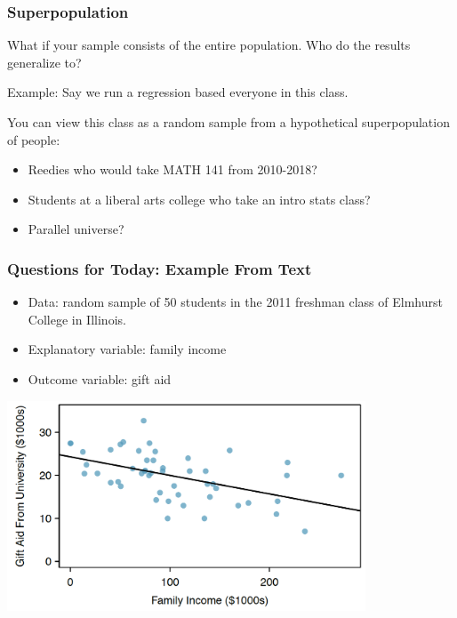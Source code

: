 \documentclass[handout]{beamer}
\newcommand{\blue}[1]{\textcolor{blue2}{#1}}
\begin{document}
\begin{frame}[fragile]
\frametitle{Superpopulation}

What if your sample consists of the \blue{entire} population.  Who do the results generalize to?

\vspace{0.25cm}

\pause Example:  Say we run a regression based everyone in this class.

\vspace{0.25cm}

\pause You can view this class as a random sample from a hypothetical \blue{superpopulation} of people:
\begin{itemize}
\pause\item Reedies who would take MATH 141 from 2010-2018?
\pause\item Students at a liberal arts college who take an intro stats class?
\pause\item Parallel universe?
\end{itemize}



\end{frame}



\begin{frame}[fragile]
\frametitle{Questions for Today: Example From Text}
\begin{itemize}
\item Data: random sample of 50 students in the 2011 freshman class of Elmhurst College in Illinois.
\pause\item Explanatory variable: family income
\pause\item Outcome variable: gift aid
\end{itemize}

\begin{center}
\includegraphics[width=0.8\textwidth]{figure/regression.png}
\end{center}

\end{frame}
\end{document}
